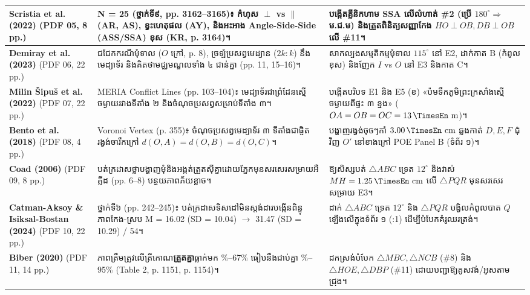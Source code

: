 \documentclass[a4paper,12pt]{article}
\newcommand{\en}[1]{{\TimesEn #1}}
\newcommand{\unit}[1]{\,\text{\en{#1}}}
\newcommand{\tri}[1]{\ensuremath{\triangle #1}}
\begin{document}
\begin{longtable}{|L{3.50cm}|L{6.65cm}|L{6.75cm}|}
\hline
\en{\textbf{Scristia et al. (2022)}} \newline (\en{PDF 05, 8 pp.}) & \en{N = 25} (ថ្នាក់ទី៩, \en{pp. 3162--3165})៖ កំហុស $\perp$ \en{vs} $\parallel$ (\en{AR, AS}), ខ្វះហេតុផល (\en{AY}), និងអះអាង \en{Angle-Side-Side (ASS/SSA)} ខុស (\en{KR, p. 3164})។ & បង្កើតគ្លីនិកហាម \en{SSA} លើលំហាត់ \en{\#2} (ប្រើ $180^\circ \Rightarrow$ \textbf{ម.ជ.ម}) និងត្រួតពិនិត្យសញ្ញាកែង $HO\perp OB, DB\perp OB$ លើ \en{\#11}។ \\
\hline
\en{\textbf{Demiray et al. (2023)}} \newline (\en{PDF 06, 22 pp.}) & ជជែកករណីមុំទាល ($O$ ក្រៅ, \en{p. 8}), ច្រឡំប្រសព្វមេដ្យាន ($2k:k$) នឹងមេដ្យាទ័រ និងគិតថាមជ្ឈមណ្ឌលទាំង ៤ ជាន់គ្នា (\en{pp. 11, 15--16})។ & សាកល្បងសម្មតិកម្មមុំទាល $115^\circ$ នៅ \en{E2}, ដាក់កាត \en{B} (កំពូលខុស) និងញែក $I$ \en{vs} $O$ នៅ \en{E3} និងកាត \en{C}។ \\
\hline
\en{\textbf{Milin Šipuš et al. (2022)}} \newline (\en{PDF 07, 22 pp.}) & \en{MERIA Conflict Lines (pp. 103--104)}៖ មេដ្យាទ័រជាព្រំដែនស្មើចម្ងាយរវាងទីតាំង ២ និងចំណុចប្រសព្វសម្រាប់ទីតាំង ៣។ & បង្កើតបរិបទ \en{E1} និង \en{E5} (ខ) «ប៉មទឹកភូមិព្រះក្រសាំងស្មើចម្ងាយពីផ្ទះ ៣ ខ្នង» ($OA=OB=OC=13\unit{m}$)។ \\
\hline
\en{\textbf{Bento et al. (2018)}} \newline (\en{PDF 08, 4 pp.}) & \en{Voronoi Vertex (p. 355)}៖ ចំណុចប្រសព្វមេដ្យាទ័រ ៣ ទីតាំងជាផ្ចិតរង្វង់ចារឹកក្រៅ $d(O,A)=d(O,B)=d(O,C)$។ & បង្ហាញរង្វង់ចុចៗកាំ $3.00\unit{cm}$ ឆ្លងកាត់ $D, E, F$ ជុំវិញ $O'$ នៅខាងក្រៅ \en{POE Panel B} (ទំព័រ ១)។ \\
\hline
\en{\textbf{Coad (2006)}} \newline (\en{PDF 09, 8 pp.}) & បត់ក្រដាសថ្លាបង្ហាញមុំនិងអង្កត់ត្រួតស៊ីគ្នាដោយភ្នែកមុនសរសេរសម្រាយអឺគ្លីដ (\en{pp. 6--8}) បន្ថយភាពភ័យខ្លាច។ & ឱ្យសិស្សបត់ $\tri{ABC}$ ទ្រេត $12^\circ$ និងវាស់ $MH=1.25\unit{cm}$ លើ $\tri{PQR}$ មុនសរសេរសម្រាយ \en{E3}។ \\
\hline
\en{\textbf{Catman-Aksoy \& Isiksal-Bostan (2024)}} \newline (\en{PDF 10, 22 pp.}) & ថ្នាក់ទី៦ (\en{pp. 242--245})៖ បត់ក្រដាសទិសដៅមិនស្ដង់ដារបង្កើនពិន្ទុភាពកែង-ស្រប \en{M = 16.02 (SD = 10.04) $\to$ 31.47 (SD = 10.29) / 54}។ & ដាក់ $\tri{ABC}$ ទ្រេត $12^\circ$ និង $\tri{PQR}$ បង្វិលកំពូលបាត $Q$ ឡើងលើក្នុងទំព័រ ១ (\en{1:1}) ដើម្បីបំបែកគំរូឈរត្រង់។ \\
\hline
\en{\textbf{Biber (2020)}} \newline (\en{PDF 11, 14 pp.}) & ភាពត្រឹមត្រូវលើត្រីកោណ\textbf{ត្រួតគ្នា}ធ្លាក់មក \en{44\%--67\%} ធៀបនឹងជាប់គ្នា \en{71\%--95\% (Table 2, p. 1151, p. 1154)}។ & ដកស្រង់បំបែក $\tri{MBC}, \tri{NCB}$ (\en{\#8}) និង $\tri{HOE}, \tri{DBP}$ (\en{\#11}) ដោយបញ្ជាឱ្យគូសវង់/អូសតាមជ្រុង។ \\

\end{longtable}
\end{document}
